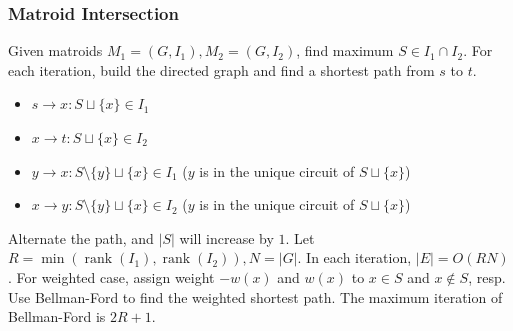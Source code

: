 
\subsubsection{Matroid Intersection}
Given matroids \(M_1=(G,I_1),M_2=(G,I_2)\), find maximum \(S\in I_1\cap I_2\).
For each iteration, build the directed graph and find a shortest path from \(s\) to \(t\).
\begin{itemize}[nosep]
    \item \(s \to x: S \sqcup \{x\} \in I_1\)
    \item \(x \to t: S \sqcup \{x\} \in I_2\)
    \item \(y \to x: S \setminus \{y\} \sqcup \{x\} \in I_1\) (\(y\) is in the unique circuit of \(S \sqcup \{x\}\))
    \item \(x \to y: S \setminus \{y\} \sqcup \{x\} \in I_2\) (\(y\) is in the unique circuit of \(S \sqcup \{x\}\))
\end{itemize}
Alternate the path, and \(|S|\) will increase by \(1\).
Let \(R = \min(\operatorname{rank}(I_1), \operatorname{rank}(I_2)), N = |G|\).
In each iteration, \(|E| = O(RN)\).
For weighted case, assign weight \(-w(x)\) and \(w(x)\) to \(x\in S\) and \(x\notin S\), resp.
Use Bellman-Ford to find the weighted shortest path.
The maximum iteration of Bellman-Ford is \(2R+1\).
